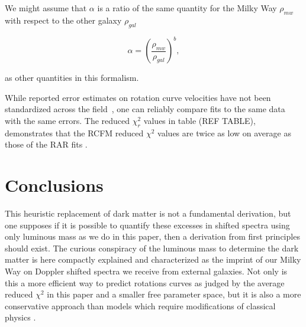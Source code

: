 \documentclass[reprint,%
 amsmath,amssymb,
 aps,
]{revtex4-1}
\begin{document}
We might assume that $\alpha$ is a ratio of the same quantity for  the Milky Way $\rho_{mw}$ with respect to the other   galaxy $\rho_{gal}$  

\begin{equation}
\alpha=\left(\frac{\rho_{mw}}{\rho_{gal}}\right)^{b}  ,
\label{correl}
\end{equation}

as other quantities in this formalism.
 

While reported error    estimates on rotation curve velocities  have not been standardized across the field~\citep{Blok,Gent},     one can reliably   compare fits to the same data with the same  errors. The     reduced $\chi^2_r$ values in table (REF TABLE), demonstrates that the RCFM reduced $\chi^2$ values are twice as low on average as those of the RAR fits  \cite{McGaugh2016RAR}.


 
 \section{  Conclusions \label{sec:conclu}  }
 

This heuristic replacement of dark matter is not a fundamental derivation, but    one supposes if it is possible to quantify these
excesses in shifted spectra using only luminous mass as we do in this paper,  then a       derivation from first principles should   exist.  The curious conspiracy of the luminous mass to   determine the dark matter  is here   compactly explained and characterized as the imprint of our Milky Way on Doppler shifted spectra we receive from external galaxies. Not only is this a more efficient way to predict rotations curves as judged by the average reduced $\chi^2$ in this paper and a smaller free parameter space, but it is also a  more conservative approach than models which require modifications of classical physics  \cite{de_Blok_2010}.  
  
 
 

  
 
   
\end{document}
